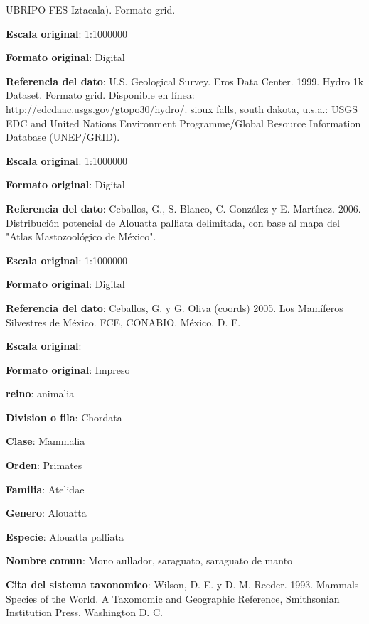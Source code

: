 \documentclass[twoside]{book}
\begin{document}
{UBRIPO-FES Iztacala). Formato grid.

\textbf{Escala original}: 1:1000000

\textbf{Formato original}: Digital

\textbf{Referencia del dato}: U.S. Geological Survey. Eros Data Center. 1999. Hydro 1k Dataset. Formato grid. Disponible en línea: http://edcdaac.usgs.gov/gtopo30/hydro/. sioux falls, south dakota, u.s.a.: USGS EDC and United Nations Environment Programme/Global Resource Information Database (UNEP/GRID).

\textbf{Escala original}: 1:1000000

\textbf{Formato original}: Digital

\textbf{Referencia del dato}: Ceballos, G., S. Blanco, C. González y E. Martínez. 2006. Distribución potencial de Alouatta palliata delimitada, con base al mapa del "Atlas Mastozoológico de México".

\textbf{Escala original}: 1:1000000

\textbf{Formato original}: Digital

\textbf{Referencia del dato}: Ceballos, G. y G. Oliva (coords) 2005. Los Mamíferos Silvestres de México. FCE, CONABIO. México. D. F.

\textbf{Escala original}:

\textbf{Formato original}: Impreso


\textbf{reino}: animalia

\textbf{Division o fila}: Chordata

\textbf{Clase}: Mammalia

\textbf{Orden}: Primates

\textbf{Familia}: Atelidae

\textbf{Genero}: Alouatta

\textbf{Especie}: Alouatta palliata

\textbf{Nombre comun}: Mono aullador, saraguato, saraguato de manto

\textbf{Cita del sistema taxonomico}: Wilson, D. E. y D. M. Reeder. 1993. Mammals Species of the World. A Taxomomic and Geographic Reference, Smithsonian Institution Press, Washington D. C.

}
\end{document}

